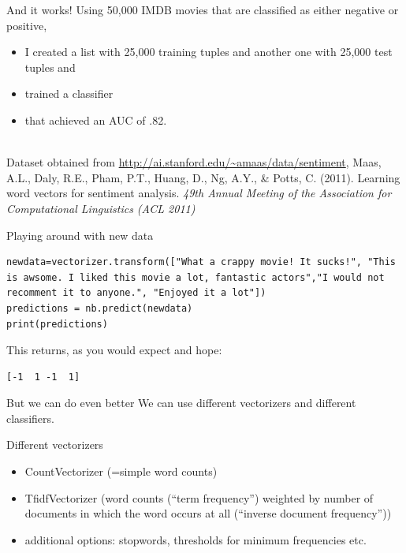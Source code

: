\documentclass{beamer}
\begin{document}
\begin{frame}{And it works!}
Using 50,000 IMDB movies that are classified as either negative or positive,
\begin{itemize}
\item I created a list with 25,000 training tuples and another one with 25,000 test tuples and
\item trained a classifier
\item that achieved an AUC of .82.
\end{itemize}
~\\
\tiny{Dataset obtained from \url{http://ai.stanford.edu/~amaas/data/sentiment}, Maas, A.L., Daly, R.E., Pham, P.T., Huang, D., Ng, A.Y., \& Potts, C. (2011). Learning word vectors for sentiment analysis. \emph{49th Annual Meeting of the Association for Computational Linguistics (ACL 2011)}
}

\end{frame}

\begin{frame}[fragile]{Playing around with new data}
\begin{lstlisting}
newdata=vectorizer.transform(["What a crappy movie! It sucks!", "This is awsome. I liked this movie a lot, fantastic actors","I would not recomment it to anyone.", "Enjoyed it a lot"])
predictions = nb.predict(newdata)
print(predictions)
\end{lstlisting}
This returns, as you would expect and hope:
\begin{lstlisting} 
[-1  1 -1  1]
\end{lstlisting}


\end{frame}




\begin{frame}{But we can do even better}
	We can use different vectorizers and different classifiers.
\end{frame}

\begin{frame}{Different vectorizers}
	\begin{itemize}
		\item CountVectorizer (=simple word counts)
		\item TfidfVectorizer (word counts (``term frequency'') weighted by number of documents in which the word occurs at all (``inverse document frequency''))
		\item additional options: stopwords, thresholds for minimum frequencies etc.
	\end{itemize}
\end{frame}
\end{document}
